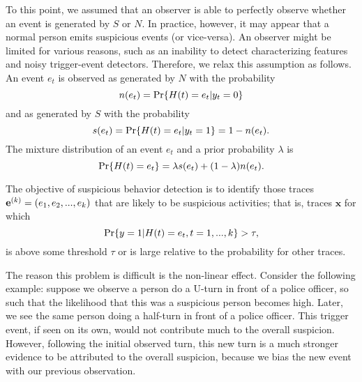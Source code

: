 To this point, we assumed that an observer is able to perfectly observe whether an event is generated by $S$ or $N$. In practice, however, it may appear that a normal person emits suspicious events (or vice-versa). An observer might be limited for various reasons, such as an inability to detect characterizing features and noisy trigger-event detectors. Therefore, we relax this assumption as follows. An event $e_t$ is observed as generated by $N$ with the probability 
\begin{equation}
	n(e_t) = \text{Pr}\{H(t)=e_t|y_t=0\}
\end{equation}
and as generated by $S$ with the probability 
\begin{equation}
	s(e_t) = \text{Pr}\{H(t)=e_t|y_t=1\}= 1 - n(e_t).
\end{equation}
The mixture distribution of an event $e_t$ and a prior probability $\lambda$ is
\begin{equation}
  \text{Pr}\{H(t)=e_t\} = \lambda s(e_t) + (1-\lambda) n(e_t).
\end{equation}
  

The objective of suspicious behavior detection is to identify those traces $\mathbf{e}^{\scriptsize(k)}=(e_1,e_2,...,e_k)$ that are likely to be suspicious activities; that is, traces $\mathbf{x}$ for which
\begin{equation}
		\text{Pr}\{y=1|H(t)=e_t, t=1,...,k\} > \tau,
\label{eq:detect-sequence}
\end{equation}
is above some threshold $\tau$ or is large relative to the probability for other traces.
%

The reason this problem is difficult is the non-linear effect. Consider the following example: suppose we observe a person do a U-turn in front of a police officer, so such that the likelihood that this was a suspicious person becomes high. Later, we see the same person doing a half-turn in front of a police officer. This trigger event, if seen on its own, would not contribute much to the overall suspicion. However, following the initial observed turn, this new turn is a much stronger evidence to be attributed to the overall suspicion, because we bias the new event with our previous observation.

